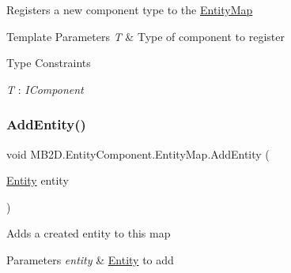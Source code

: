 Registers a new component type to the \hyperlink{class_m_b2_d_1_1_entity_component_1_1_entity_map}{Entity\+Map} 


\begin{DoxyTemplParams}{Template Parameters}
{\em T} & Type of component to register\\
\hline
\end{DoxyTemplParams}
\begin{Desc}
\item[Type Constraints]\begin{description}
\item[{\em T} : {\em I\+Component}]\end{description}
\end{Desc}
\hypertarget{class_m_b2_d_1_1_entity_component_1_1_entity_map_a0800ef900f92c04902d5b1c355aab900}{}\label{class_m_b2_d_1_1_entity_component_1_1_entity_map_a0800ef900f92c04902d5b1c355aab900} 
\subsubsection{\texorpdfstring{Add\+Entity()}{AddEntity()}}
{\footnotesize\ttfamily void M\+B2\+D.\+Entity\+Component.\+Entity\+Map.\+Add\+Entity (\begin{DoxyParamCaption}\item[{\hyperlink{class_m_b2_d_1_1_entity_component_1_1_entity}{Entity}}]{entity }\end{DoxyParamCaption})\hspace{0.3cm}{\ttfamily [inline]}}



Adds a created entity to this map 


\begin{DoxyParams}{Parameters}
{\em entity} & \hyperlink{class_m_b2_d_1_1_entity_component_1_1_entity}{Entity} to add\\
\hline
\end{DoxyParams}
\hypertarget{class_m_b2_d_1_1_entity_component_1_1_entity_map_af2aefc425308f1ca680b0083f3acab0d}{}\label{class_m_b2_d_1_1_entity_component_1_1_entity_map_af2aefc425308f1ca680b0083f3acab0d} 
